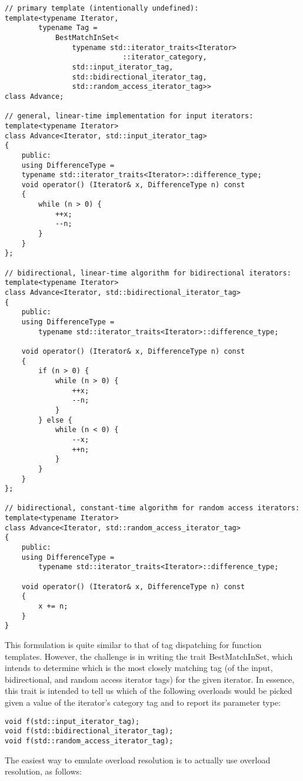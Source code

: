 \begin{lstlisting}[style=styleCXX]
// primary template (intentionally undefined):
template<typename Iterator,
		typename Tag =
			BestMatchInSet<
				typename std::iterator_traits<Iterator>
							::iterator_category,
				std::input_iterator_tag,
				std::bidirectional_iterator_tag,
				std::random_access_iterator_tag>>
class Advance;

// general, linear-time implementation for input iterators:
template<typename Iterator>
class Advance<Iterator, std::input_iterator_tag>
{
	public:
	using DifferenceType =
	typename std::iterator_traits<Iterator>::difference_type;
	void operator() (Iterator& x, DifferenceType n) const
	{
		while (n > 0) {
			++x;
			--n;
		}
	}
};

// bidirectional, linear-time algorithm for bidirectional iterators:
template<typename Iterator>
class Advance<Iterator, std::bidirectional_iterator_tag>
{
	public:
	using DifferenceType =
		typename std::iterator_traits<Iterator>::difference_type;
		
	void operator() (Iterator& x, DifferenceType n) const
	{
		if (n > 0) {
			while (n > 0) {
				++x;
				--n;
			}
		} else {
			while (n < 0) {
				--x;
				++n;
			}
		}
	}
};

// bidirectional, constant-time algorithm for random access iterators:
template<typename Iterator>
class Advance<Iterator, std::random_access_iterator_tag>
{
	public:
	using DifferenceType =
		typename std::iterator_traits<Iterator>::difference_type;
		
	void operator() (Iterator& x, DifferenceType n) const
	{
		x += n;
	}
}
\end{lstlisting}

This formulation is quite similar to that of tag dispatching for function templates. However, the challenge is in writing the trait BestMatchInSet, which intends to determine which is the most closely matching tag (of the input, bidirectional, and random access iterator tags) for the given iterator. In essence, this trait is intended to tell us which of the following overloads would be picked given a value of the iterator’s category tag and to report its parameter type:

\begin{lstlisting}[style=styleCXX]
void f(std::input_iterator_tag);
void f(std::bidirectional_iterator_tag);
void f(std::random_access_iterator_tag);
\end{lstlisting}

The easiest way to emulate overload resolution is to actually use overload resolution, as follows:

